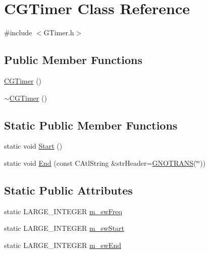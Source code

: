 \hypertarget{class_c_g_timer}{}\section{C\+G\+Timer Class Reference}
\label{class_c_g_timer}


{\ttfamily \#include $<$G\+Timer.\+h$>$}

\subsection*{Public Member Functions}
\begin{DoxyCompactItemize}
\item 
\hyperlink{class_c_g_timer_a2dc7ab7330223cbb58d3527a9a56b219}{C\+G\+Timer} ()
\item 
\hyperlink{class_c_g_timer_a52ee49421cf9165cb24c3e741e4affe3}{$\sim$\+C\+G\+Timer} ()
\end{DoxyCompactItemize}
\subsection*{Static Public Member Functions}
\begin{DoxyCompactItemize}
\item 
static void \hyperlink{class_c_g_timer_add8136330658497df42f2b4e4199a2f4}{Start} ()
\item 
static void \hyperlink{class_c_g_timer_a765c2a565b23349c896fe872fd30b6fb}{End} (const C\+Atl\+String \&str\+Header=\hyperlink{_g_types_8h_a3a88c8b4bbda44b1463e08d73a6d963f}{G\+N\+O\+T\+R\+A\+N\+S}(\char`\"{}\char`\"{}))
\end{DoxyCompactItemize}
\subsection*{Static Public Attributes}
\begin{DoxyCompactItemize}
\item 
static L\+A\+R\+G\+E\+\_\+\+I\+N\+T\+E\+G\+E\+R \hyperlink{class_c_g_timer_a72a8a712189cad4d9831df36e661cff7}{m\+\_\+sw\+Freq}
\item 
static L\+A\+R\+G\+E\+\_\+\+I\+N\+T\+E\+G\+E\+R \hyperlink{class_c_g_timer_a43633ab372669c28b164e59b4d33c905}{m\+\_\+sw\+Start}
\item 
static L\+A\+R\+G\+E\+\_\+\+I\+N\+T\+E\+G\+E\+R \hyperlink{class_c_g_timer_af9d7d06bca09a2a6c1a9b917da97b56f}{m\+\_\+sw\+End}
\end{DoxyCompactItemize}


